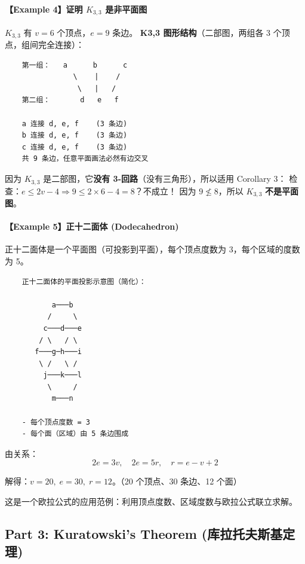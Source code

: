 \documentclass[10pt,a4paper,openany]{ctexbook}
\theoremstyle{definition}
\theoremstyle{remark}
\renewenvironment{quote}
  {\list{}{\leftmargin=1em\rightmargin=0pt\topsep=0.5pt\partopsep=0pt}\item[]}
  {\endlist}
\begin{document}
\paragraph{【Example 4】证明 $K_{3,3}$ 是非平面图}

$K_{3,3}$ 有 $v = 6$ 个顶点，$e = 9$ 条边。
\textbf{K3,3 图形结构}（二部图，两组各 3 个顶点，组间完全连接）：
{\footnotesize\begin{verbatim}
    第一组：   a      b      c
                \    |    /
                 \   |   /
    第二组：       d   e   f

    a 连接 d, e, f    (3 条边)
    b 连接 d, e, f    (3 条边)
    c 连接 d, e, f    (3 条边)
    共 9 条边，任意平面画法必然有边交叉
\end{verbatim}}

因为 $K_{3,3}$ 是二部图，它\textbf{没有 3-回路}（没有三角形），所以适用 Corollary 3：
检查：$e \le 2v - 4 \Rightarrow 9 \le 2 \times 6 - 4 = 8$？不成立！
因为 $9 \nleq 8$，所以 $K_{3,3}$ \textbf{不是平面图}。
\vspace{-2pt}

\paragraph{【Example 5】正十二面体 (Dodecahedron)}

正十二面体是一个平面图（可投影到平面），每个顶点度数为 3，每个区域的度数为 5。
{\footnotesize\begin{verbatim}
    正十二面体的平面投影示意图（简化）：
    
           a───b
          /     \
         c───d───e
        / \   / \
       f───g─h───i
        \ /   \ /
         j───k───l
          \     /
           m───n

    - 每个顶点度数 = 3
    - 每个面（区域）由 5 条边围成
\end{verbatim}}

由关系：
\[
2e = 3v,\quad 2e = 5r,\quad r = e - v + 2
\]

解得：$v = 20,\; e = 30,\; r = 12$。（20 个顶点、30 条边、12 个面）
\begin{quote}
这是一个欧拉公式的应用范例：利用顶点度数、区域度数与欧拉公式联立求解。

\end{quote}
\vspace{-2pt}

\subsection{Part 3: Kuratowski's Theorem (库拉托夫斯基定理)}
\end{document}
